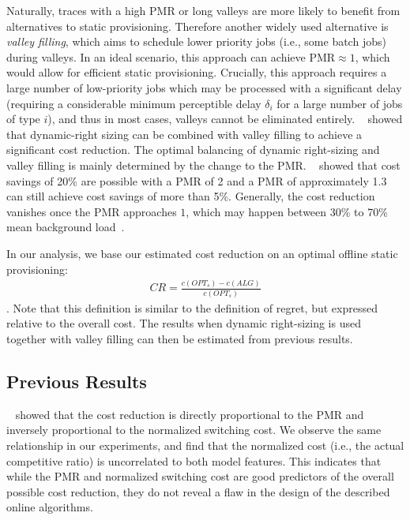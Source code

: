 Naturally, traces with a high PMR or long valleys are more likely to benefit from alternatives to static provisioning. Therefore another widely used alternative is \emph{valley filling}, which aims to schedule lower priority jobs (i.e., some batch jobs) during valleys. In an ideal scenario, this approach can achieve $\text{PMR} \approx 1$, which would allow for efficient static provisioning. Crucially, this approach requires a large number of low-priority jobs which may be processed with a significant delay (requiring a considerable minimum perceptible delay $\delta_i$ for a large number of jobs of type $i$), and thus in most cases, valleys cannot be eliminated entirely. \citeauthor*{Lin2011}~\cite{Lin2011} showed that dynamic-right sizing can be combined with valley filling to achieve a significant cost reduction. The optimal balancing of dynamic right-sizing and valley filling is mainly determined by the change to the PMR. \citeauthor*{Lin2011}~\cite{Lin2011} showed that cost savings of 20\% are possible with a PMR of 2 and a PMR of approximately 1.3 can still achieve cost savings of more than 5\%. Generally, the cost reduction vanishes once the PMR approaches $1$, which may happen between 30\% to 70\% mean background load~\cite{Lin2011}.

In our analysis, we base our estimated cost reduction on an optimal offline static provisioning: \begin{align*}
    CR = \frac{c(OPT_s) - c(ALG)}{c(OPT_s)}
\end{align*}. Note that this definition is similar to the definition of regret, but expressed relative to the overall cost. The results when dynamic right-sizing is used together with valley filling can then be estimated from previous results.

\subsection{Previous Results}

\citeauthor*{Lin2011}~\cite{Lin2011} showed that the cost reduction is directly proportional to the PMR and inversely proportional to the normalized switching cost. We observe the same relationship in our experiments, and find that the normalized cost (i.e., the actual competitive ratio) is uncorrelated to both model features. This indicates that while the PMR and normalized switching cost are good predictors of the overall possible cost reduction, they do not reveal a flaw in the design of the described online algorithms.

